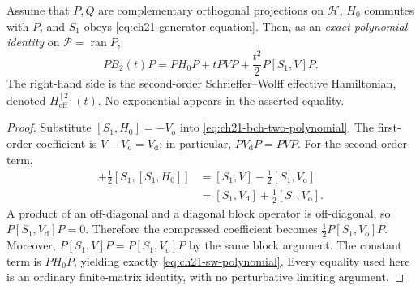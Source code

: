 \begin{theorem}
\label{thm:ch21-sw-compressed}
Assume that $P,Q$ are complementary orthogonal projections on
$\mathcal H$, $H_0$ commutes with $P$, and $S_1$ obeys
\eqref{eq:ch21-generator-equation}.  Then, as an \emph{exact polynomial
identity} on $\mathcal P=\operatorname{ran}P$,
\begin{equation}
 P B_2(t)P
 =PH_0P+tPVP+\frac{t^2}{2}P[S_1,V]P.
\label{eq:ch21-sw-polynomial}
\end{equation}
The right-hand side is the second-order Schrieffer--Wolff effective
Hamiltonian, denoted $H_{\mathrm{eff}}^{[2]}(t)$.  No exponential
appears in the asserted equality.
\end{theorem}
\begin{proof}
Substitute $[S_1,H_0]=-V_{\mathrm o}$ into
\eqref{eq:ch21-bch-two-polynomial}.  The first-order coefficient is
$V-V_{\mathrm o}=V_{\mathrm d}$; in particular,
$PV_{\mathrm d}P=PVP$.  For the second-order term,
\begin{align*}
[S_1,V]+\tfrac12[S_1,[S_1,H_0]]
 &= [S_1,V]-\tfrac12[S_1,V_{\mathrm o}]\\
 &= [S_1,V_{\mathrm d}]+\tfrac12[S_1,V_{\mathrm o}].
\end{align*}
A product of an off-diagonal and a diagonal block operator is
off-diagonal, so $P[S_1,V_{\mathrm d}]P=0$.  Therefore the compressed
coefficient becomes
$\tfrac12P[S_1,V_{\mathrm o}]P$.  Moreover,
$P[S_1,V]P=P[S_1,V_{\mathrm o}]P$ by the same block argument.
The constant term is $PH_0P$, yielding exactly
\eqref{eq:ch21-sw-polynomial}.  Every equality used here is an
ordinary finite-matrix identity, with no perturbative limiting
argument.
\end{proof}

